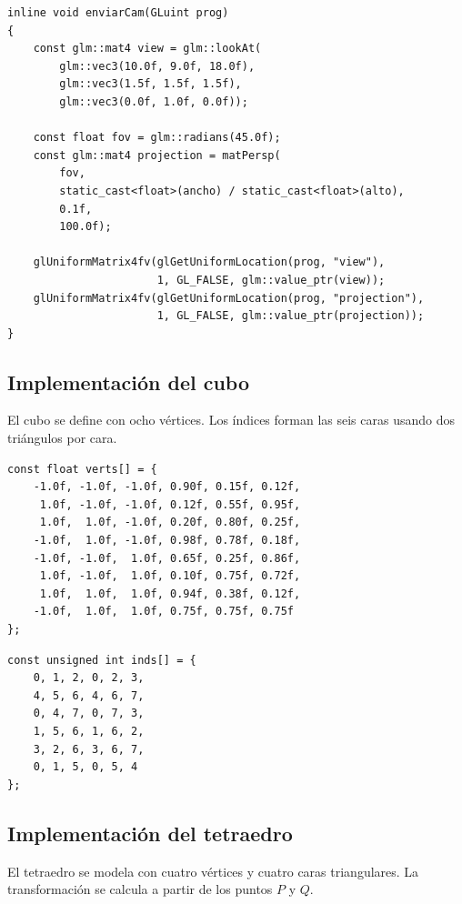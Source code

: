 \documentclass[12pt,a4paper]{article}
\begin{document}
\begin{lstlisting}[style=cxx,caption={Envio de matrices view y projection al shader.}]
inline void enviarCam(GLuint prog)
{
    const glm::mat4 view = glm::lookAt(
        glm::vec3(10.0f, 9.0f, 18.0f),
        glm::vec3(1.5f, 1.5f, 1.5f),
        glm::vec3(0.0f, 1.0f, 0.0f));

    const float fov = glm::radians(45.0f);
    const glm::mat4 projection = matPersp(
        fov,
        static_cast<float>(ancho) / static_cast<float>(alto),
        0.1f,
        100.0f);

    glUniformMatrix4fv(glGetUniformLocation(prog, "view"),
                       1, GL_FALSE, glm::value_ptr(view));
    glUniformMatrix4fv(glGetUniformLocation(prog, "projection"),
                       1, GL_FALSE, glm::value_ptr(projection));
}
\end{lstlisting}

\subsection*{Implementaci\'on del cubo}
El cubo se define con ocho v\'ertices. Los \'indices forman las seis caras usando dos tri\'angulos por cara.

\begin{lstlisting}[style=cxx,caption={Vertices principales del cubo con colores.}]
const float verts[] = {
    -1.0f, -1.0f, -1.0f, 0.90f, 0.15f, 0.12f,
     1.0f, -1.0f, -1.0f, 0.12f, 0.55f, 0.95f,
     1.0f,  1.0f, -1.0f, 0.20f, 0.80f, 0.25f,
    -1.0f,  1.0f, -1.0f, 0.98f, 0.78f, 0.18f,
    -1.0f, -1.0f,  1.0f, 0.65f, 0.25f, 0.86f,
     1.0f, -1.0f,  1.0f, 0.10f, 0.75f, 0.72f,
     1.0f,  1.0f,  1.0f, 0.94f, 0.38f, 0.12f,
    -1.0f,  1.0f,  1.0f, 0.75f, 0.75f, 0.75f
};
\end{lstlisting}

\begin{lstlisting}[style=cxx,caption={Indices del cubo: seis caras con dos triangulos por cara.}]
const unsigned int inds[] = {
    0, 1, 2, 0, 2, 3,
    4, 5, 6, 4, 6, 7,
    0, 4, 7, 0, 7, 3,
    1, 5, 6, 1, 6, 2,
    3, 2, 6, 3, 6, 7,
    0, 1, 5, 0, 5, 4
};
\end{lstlisting}

\subsection*{Implementaci\'on del tetraedro}
El tetraedro se modela con cuatro v\'ertices y cuatro caras triangulares. La transformaci\'on se calcula a partir de los puntos $P$ y $Q$.
\end{document}
